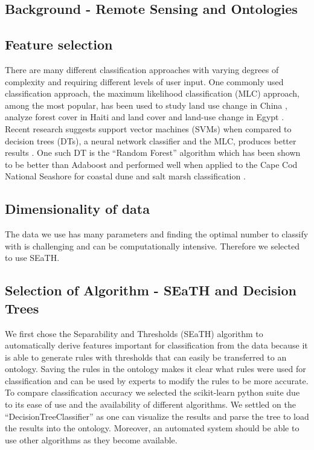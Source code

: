 \documentclass[authoryear, review,12pt,number]{elsarticle}
\begin{document}
\subsection{Background - Remote Sensing and Ontologies}

\subsection{Feature selection}

There are many different classification approaches with varying degrees of
complexity and requiring different levels of user input. One commonly used
classification approach, the maximum likelihood classification (MLC) approach,
among the most popular, has been used to study land use change in China
\citep{Ding2007}, analyze forest cover in Haiti \citep{Churches2014} and land
cover and land-use change in Egypt \citep{Shalaby2007}. Recent research suggests
support vector machines (SVMs) when compared to decision trees (DTs), a neural
network classifier and the MLC, produces better results \citep{Huang2002}. One
such DT is the ``Random Forest'' algorithm which has been shown to be better
than Adaboost \citep{Chan2008} and performed well when applied to the Cape Cod
National Seashore for coastal dune and salt marsh classification
\citep{Timm2012}.
\subsection{Dimensionality of data}
The data we use has many parameters and finding the optimal number to classify
with is challenging and can be computationally intensive. Therefore we selected
to use SEaTH.

\subsection{Selection of Algorithm - SEaTH and Decision Trees}
We first chose the Separability and Thresholds
(SEaTH) \citep{Nussbaum2006} algorithm to automatically derive features important
for classification from the data because it is able to generate rules with
thresholds that can easily be transferred to an ontology. Saving the rules in
the ontology makes it clear what rules were used for classification and can be
used by experts to modify the rules to be more accurate. To compare
classification accuracy we selected the scikit-learn python suite
\citep{scikit-learn} due to its ease of use and the availability of
different algorithms. We settled on the ``DecisionTreeClassifier'' as one can
visualize the results and parse the tree to load the results into the ontology.
Moreover, an automated system should be able to use other algorithms as they become available.
\end{document}
